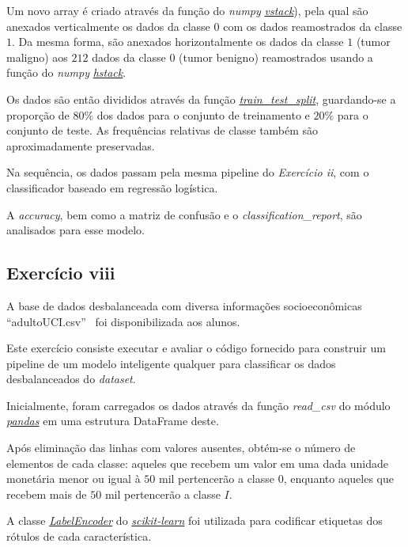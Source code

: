 Um novo array é criado através da função do \textit{numpy} \href{https://numpy.org/doc/stable/reference/generated/numpy.vstack.html}{\textit{vstack}}), pela qual são anexados verticalmente os dados da classe $0$ com os dados reamostrados da classe $1$. Da mesma forma, são anexados horizontalmente os dados da classe $1$ (tumor maligno) aos $212$ dados da classe $0$ (tumor benigno) reamostrados usando a função do \textit{numpy} \href{https://numpy.org/doc/stable/reference/generated/numpy.hstack.html}{\textit{hstack}}.


Os dados são então divididos através da função \href{https://scikit-learn.org/stable/modules/generated/sklearn.model_selection.train_test_split.html}{\textit{train\_test\_split}}, guardando-se a proporção de $80\%$ dos dados para o conjunto de treinamento e $20\%$ para o conjunto de teste. As frequências relativas de classe também são aproximadamente preservadas.

Na sequência, os dados passam pela mesma pipeline do \textit{Exercício ii}, com o classificador baseado em regressão logística. 

A \textit{accuracy}, bem como a  matriz de confusão  e o \textit{classification\_report}, são analisados para esse modelo.

\subsection{Exercício viii}

A base de dados desbalanceada com diversa informações socioeconômicas “adultoUCI.csv” \ foi disponibilizada aos alunos.

Este exercício consiste executar e avaliar o código fornecido para construir um pipeline de um modelo inteligente qualquer para classificar os dados desbalanceados do \textit{dataset}.

Inicialmente, foram carregados os dados através da função \textit{read\_csv} do módulo \href{https://pandas.pydata.org/}{\textit{pandas}} em uma estrutura DataFrame deste.

Após eliminação das linhas com valores ausentes, obtém-se o número de elementos de cada classe: aqueles que recebem um valor em uma dada unidade monetária menor ou igual à $50$ mil pertencerão a classe $0$, enquanto aqueles que recebem mais de $50$ mil pertencerão a classe $I$.


A classe \textit{\href{https://scikit-learn.org/stable/modules/generated/sklearn.preprocessing.LabelEncoder.html}{LabelEncoder}} do \href{https://scikit-learn.org/stable/index.html}{\textit{scikit-learn}} \citep{scikit-learn} foi utilizada para codificar etiquetas dos rótulos de cada característica.


